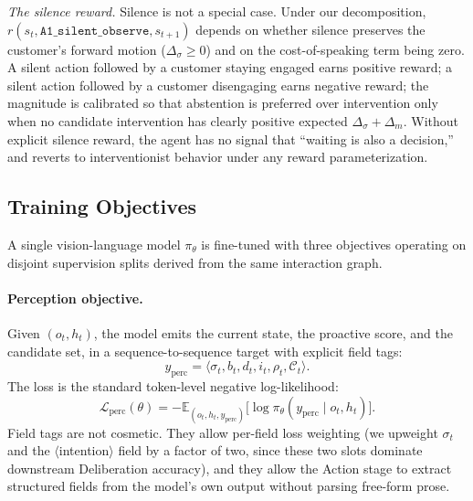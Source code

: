 \documentclass{article}
\begin{document}
\textit{The silence reward.}
Silence is not a special case. Under our decomposition, $r(s_t, \texttt{A1\_silent\_observe}, s_{t+1})$ depends on whether silence preserves the customer's forward motion ($\Delta_\sigma \ge 0$) and on the cost-of-speaking term being zero. A silent action followed by a customer staying engaged earns positive reward; a silent action followed by a customer disengaging earns negative reward; the magnitude is calibrated so that abstention is preferred over intervention only when no candidate intervention has clearly positive expected $\Delta_\sigma + \Delta_m$. Without explicit silence reward, the agent has no signal that ``waiting is also a decision,'' and reverts to interventionist behavior under any reward parameterization.

\subsection{Training Objectives}
\label{sec:method:objectives}

A single vision-language model $\pi_\theta$ is fine-tuned with three objectives operating on disjoint supervision splits derived from the same interaction graph.

\paragraph{Perception objective.}
Given $(o_t, h_t)$, the model emits the current state, the proactive score, and the candidate set, in a sequence-to-sequence target with explicit field tags:
\[
y_\text{perc} = \langle\sigma_t, b_t, d_t, i_t, \rho_t, \mathcal{C}_t\rangle.
\]
The loss is the standard token-level negative log-likelihood:
\[
\mathcal{L}_\text{perc}(\theta) = -\mathbb{E}_{(o_t, h_t, y_\text{perc})} \big[ \log \pi_\theta(y_\text{perc} \mid o_t, h_t) \big].
\]
Field tags are not cosmetic. They allow per-field loss weighting (we upweight $\sigma_t$ and the $\langle$intention$\rangle$ field by a factor of two, since these two slots dominate downstream Deliberation accuracy), and they allow the Action stage to extract structured fields from the model's own output without parsing free-form prose.
\end{document}
